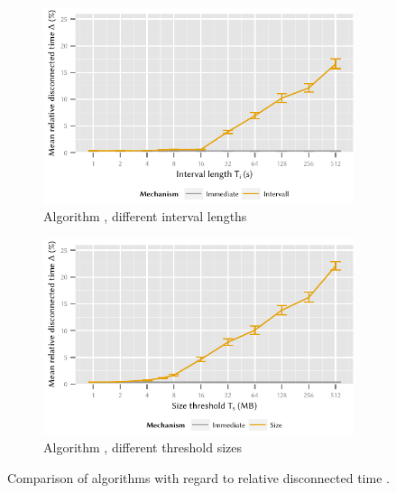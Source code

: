 \begin{figure}
	\begin{subfigure}[b]{\textwidth}
	\centering
	\includegraphics{application/cloud_file_synchronization/numerical_evaluation/figures/interval_disconnected}
	\caption{Algorithm \algointerval, different interval lengths \thresholdInterval}\label{fig:application:cloud_file_synchronisation:numerical_evaluation:disconnected:disconnected:interval}
	\end{subfigure}
	\begin{subfigure}[b]{\textwidth}
	\centering
	\includegraphics{application/cloud_file_synchronization/numerical_evaluation/figures/size_disconnected}
	\caption{Algorithm \algosize, different threshold sizes \thresholdSize}\label{fig:application:cloud_file_synchronisation:numerical_evaluation:disconnected:disconnected:size}
	\end{subfigure}

	\caption{Comparison of algorithms with regard to relative disconnected time \relativeDisconnectedTime.}\label{fig:application:cloud_file_synchronisation:numerical_evaluation:disconnected:disconnected}
\end{figure}

